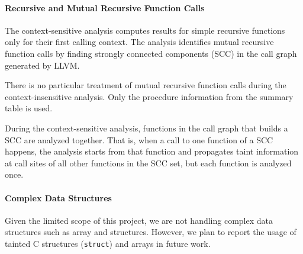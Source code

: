 \paragraph{Recursive and Mutual Recursive Function Calls} 
The context-sensitive analysis computes results for simple recursive
functions only for their first calling context.
The analysis identifies mutual recursive function calls by finding
strongly connected components (SCC) in the call graph generated
by LLVM.

There is no particular treatment of mutual recursive function
calls during the context-insensitive analysis. Only the
procedure information from the summary table is used.

During the context-sensitive analysis, functions in the call
graph that builds a SCC are analyzed together.
That is, when a call to one function of a SCC happens,
the analysis starts from that function and propagates taint
information at call sites of all other functions in the SCC
set, but each function is analyzed once.

\paragraph{Complex Data Structures}

Given the limited scope of this project, we are not handling
complex data structures such as array and structures.
However, we plan to report the usage of tainted C structures
(\texttt{struct}) and arrays in future work.